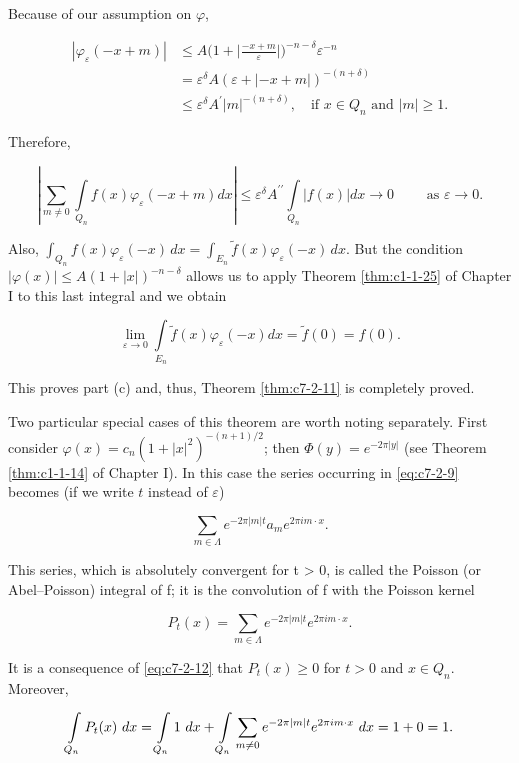 Because of our assumption on $\varphi$,

\[
\begin{aligned}|\varphi_{\varepsilon}(-x+m)|&\leq A\bigg(1+\bigg|\frac{-x+m}{\varepsilon}\bigg|\bigg)^{-n-\delta}\varepsilon^{-n}\\&=\varepsilon^{\delta}A(\varepsilon+|-x+m|)^{-(n+\delta)}\\&\leq\varepsilon^{\delta}A^{\prime}|m|^{-(n+\delta)},\quad\text{if }x\in Q_{n}\text{ and }|m|\geq1.\end{aligned}
\]

Therefore,

\[
\left|\sum_{m\neq0}\int\limits_{Q_{n}}f(x)\varphi_{\varepsilon}(-x+m)d x\right|\leq\varepsilon^{\delta}A^{\prime \prime}\int\limits_{Q_{n}}\left|f(x)\right|d x\rightarrow0\qquad\text{ as }\varepsilon\rightarrow0.
\]

Also, $\int_{Q_n} f(x)\varphi_\varepsilon(-x)\,dx = \int_{E_n} \tilde{f}(x)\varphi_\varepsilon(-x)\,dx$. But the condition $|\varphi(x)| \leq A(1 + |x|)^{-n-\delta}$ allows us to apply Theorem \ref{thm:c1-1-25} of Chapter I to this last integral and we obtain

\[
\lim_{\varepsilon\to0}\int\limits_{E_{n}}\tilde{f}(x)\varphi_{\varepsilon}(-x)d x=\tilde{f}(0)=f(0).
\]

This proves part (c) and, thus, Theorem \ref{thm:c7-2-11} is completely proved.

Two particular special cases of this theorem are worth noting separately. First consider $\varphi(x) = c_n(1 + |x|^2)^{-(n+1)/2}$; then $\Phi(y) = e^{-2\pi|y|}$ (see Theorem \ref{thm:c1-1-14} of Chapter I). In this case the series occurring in \eqref{eq:c7-2-9} becomes (if we write $t$ instead of $\varepsilon$)

\begin{equation}\label{eq:c7-2-13}
\sum_{m\in\Lambda}e^{-2\pi\left|m\right|t}a_{m}e^{2\pi i m\cdot x}.
\end{equation}

This series, which is absolutely convergent for t > 0, is called the Poisson (or Abel--Poisson) integral of f; it is the convolution of f with the Poisson kernel

\[
P_{t}(x)=\sum_{m\in\Lambda}e^{-2\pi|m|t}e^{2\pi i m\cdot x}.
\]

It is a consequence of \eqref{eq:c7-2-12} that $P_t(x) \geq 0$ for $t > 0$ and $x \in Q_n$. Moreover,

\[
\intop_{Q_{n}}P_{t}(x)\mathop{}{d}x=\intop_{Q_{n}}1\mathop{}{d}x+\intop_{Q_{n}}\sum_{m\neq0}e^{-2\pi|m|t}e^{2\pi i m\cdot x}\mathop{}{d}x=1+0=1.
\]

